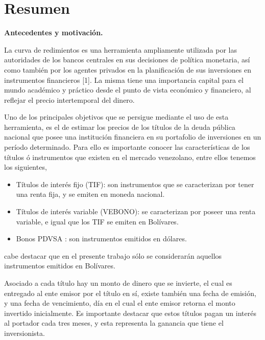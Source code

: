 \chapter*{Resumen}

\textbf{Antecedentes y motivaci\'on. \\}

\hspace*{0.4 cm} La curva de redimientos es una herramienta ampliamente utilizada por las autoridades de los bancos centrales en sus decisiones de pol\'itica monetaria, as\'i como tambi\'en por los agentes privados en la planificaci\'on de sus inversiones en instrumentos financieros [1]. La misma tiene una importancia capital
para el mundo acad\'emico y pr\'actico desde el punto de vista econ\'omico y financiero, al reflejar el precio intertemporal del dinero.

\vspace{0.5cm}

\hspace*{0.4 cm} Uno de los principales objetivos que se persigue mediante el uso de esta herramienta, es el de estimar los precios de los t\'itulos de la deuda p\'ublica nacional que posee una instituci\'on financiera en su portafolio de inversiones en un per\'iodo determinado. Para ello es importante conocer las caracter\'isticas de los t\'itulos \'o instrumentos que existen en el mercado venezolano, entre ellos tenemos los siguientes,

\vspace{0.4cm}

\begin{itemize}
  \item T\'itulos de inter\'es fijo (TIF): son instrumentos que se caracterizan por tener una renta fija, y se emiten en moneda nacional.
  \item T\'itulos de inter\'es variable (VEBONO): se caracterizan por poseer una renta variable, e igual que los TIF se emiten en Bol\'ivares.
  \item Bonos PDVSA : son instrumentos emitidos en d\'olares.
\end{itemize}

\vspace{0.5cm}

\noindent cabe destacar que en el presente trabajo s\'olo  se considerar\'an aquellos instrumentos emitidos en Bol\'ivares.

\vspace{0.5cm}

\hspace*{0.4 cm}Asociado a cada t\'itulo hay un monto de dinero que se invierte, el cual es entregado al ente emisor por el t\'itulo en s\'i, existe tambi\'en una fecha de emisi\'on, y una fecha de vencimiento, d\'ia en el cual el ente emisor retorna el monto invertido inicialmente. Es importante destacar que estos t\'itulos pagan un inter\'es al portador cada tres meses, y esta representa la ganancia que tiene el inversionista.

